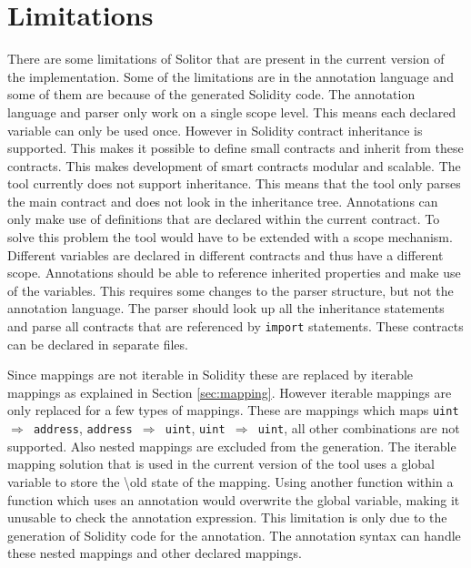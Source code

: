 \documentclass[a4paper]{article}
\begin{document}
\newpage
\section{Limitations}
\label{sec:limitations}
There are some limitations of Solitor that are present in the current version of the implementation. Some of the limitations are in the annotation language and some of them are because of the generated Solidity code. The annotation language and parser only work on a single scope level. This means each declared variable can only be used once. However in Solidity contract inheritance is supported. This makes it possible to define small contracts and inherit from these contracts. This makes development of smart contracts modular and scalable. The tool currently does not support inheritance. This means that the tool only parses the main contract and does not look in the inheritance tree. Annotations can only make use of definitions that are declared within the current contract. To solve this problem the tool would have to be extended with a scope mechanism. Different variables are declared in different contracts and thus have a different scope. Annotations should be able to reference inherited properties and make use of the variables. This requires some changes to the parser structure, but not the annotation language. The parser should look up all the inheritance statements and parse all contracts that are referenced by \texttt{import} statements. These contracts can be declared in separate files. \par
Since mappings are not iterable in Solidity these are replaced by iterable mappings as explained in Section \ref{sec:mapping}. However iterable mappings are only replaced for a few types of mappings. These are mappings which maps \texttt{uint $\Rightarrow$ address}, \texttt{address $\Rightarrow$ uint}, \texttt{uint $\Rightarrow$ uint}, all other combinations are not supported. Also nested mappings are excluded from the generation. The iterable mapping solution that is used in the current version of the tool uses a global variable to store the \textbackslash old state of the mapping. Using another function within a function which uses an  annotation would overwrite the global variable, making it unusable to check the annotation expression. This limitation is only due to the generation of Solidity code for the annotation. The annotation syntax can handle these nested mappings and other declared mappings. \par
\end{document}
